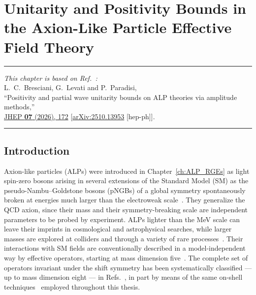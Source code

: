 \chapter{Unitarity and Positivity Bounds in the Axion-Like Particle Effective Field Theory\label{ch:ALP_bounds}}

\begin{flushright}
\small

{\color{chapterpaperrule}\rule{\textwidth}{0.5pt}}

\textit{This chapter is based on Ref.~\cite{Bresciani:2025ojh}:}\\[0.5em]
L.~C.~Bresciani, G.~Levati and P.~Paradisi,\\
``Positivity and partial wave unitarity bounds on ALP theories via amplitude methods,''\\
\href{https://doi.org/10.1007/JHEP07(2026)172}{JHEP \textbf{07} (2026), 172}
[\href{https://doi.org/10.48550/arXiv.2510.13953}{arXiv:2510.13953} [hep-ph]].

{\color{chapterpaperrule}\rule{\textwidth}{0.5pt}}
\end{flushright}

\section{Introduction}

Axion-like particles (ALPs) were introduced in Chapter~\ref{ch:ALP_RGEs} as light spin-zero bosons
arising in several extensions of the Standard Model (SM) as the pseudo-Nambu--Goldstone bosons (pNGBs) of a global
symmetry spontaneously broken at energies much larger than the electroweak
scale~\cite{Jaeckel:2010ni,Marsh:2015xka,Irastorza:2018dyq,DiLuzio:2020wdo}. They generalize the QCD
axion, since their mass and their symmetry-breaking scale are independent parameters to be probed by
experiment. ALPs lighter than the MeV scale can leave their imprints in cosmological and
astrophysical searches, while larger masses are explored at colliders and through a variety of rare
processes~\cite{DiLuzio:2023ndz}. Their interactions with SM fields are conventionally described in a
model-independent way by effective operators, starting at mass dimension five~\cite{Georgi:1986df}.
The complete set of operators invariant under the shift symmetry has been systematically classified
--- up to mass dimension eight --- in Refs.~\cite{Song:2023lxf,Grojean:2023tsd,Bertuzzo:2023slg}, in
part by means of the same on-shell techniques~\cite{DeAngelis:2022qco,Li:2022tec} employed throughout
this thesis.

